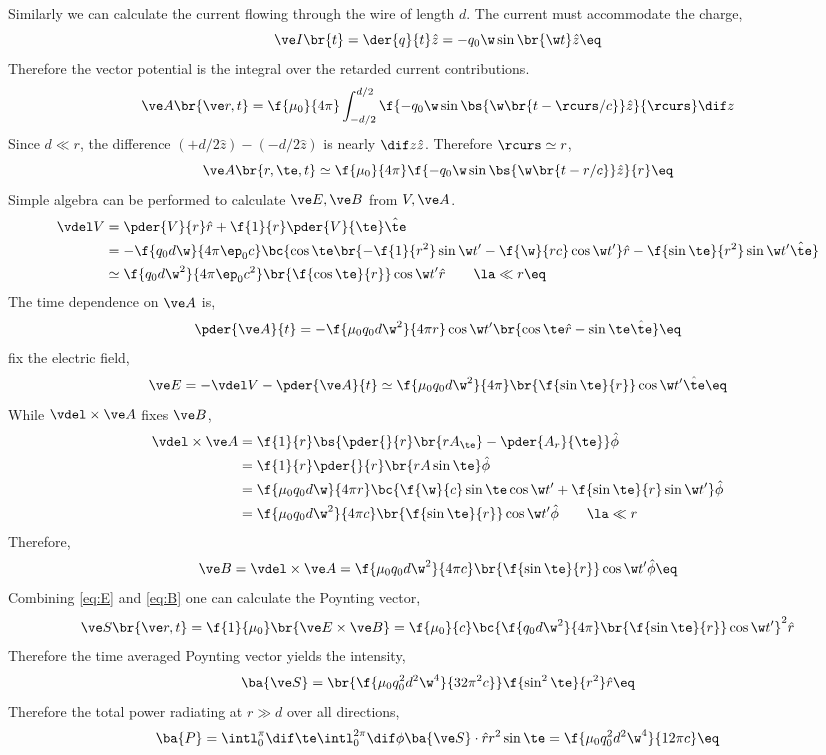 \documentclass{article}
\begin{document}
Similarly we can calculate the current flowing through the wire of length $d$. The current must accommodate the charge,
\[ \ve I \br{t} = \der{q}{t}\hat z = - q_0 \w \sin \br{\w t} \hat z \eq \label{eq:current} \]
Therefore the vector potential is the integral over the retarded current contributions.
\[ \ve A \br{\ve r, t} = \f{\mu_0}{4 \pi} \int_{-d/2}^{d/2} \f{- q_0 \w \sin\bs{\w\br{t - \rcurs / c}} \hat z}{\rcurs} \dif z \]
Since $d \ll r$, the difference $(+ d/2 \hat z) - (- d/2 \hat z)$ is nearly $\dif z \hat z$. Therefore $\rcurs \simeq r$,
\[ \ve A \br{r, \te, t} \simeq \f{\mu_0}{4 \pi} \f{- q_0 \w \sin\bs{\w\br{t - r / c}} \hat z}{r} \eq\label{eq:A}\]
Simple algebra can be performed to calculate $\ve E, \ve B$ from $V, \ve A$.
\begin{align*}
\vdel V
&= \pder{V}{r} \hat r + \f{1}{r} \pder{V}{\te} \hat \te \\
&= -\f{q_0 d \w}{4 \pi \ep_0 c} \bc{\cos \te \br{- \f{1}{r^2} \sin \w t' - \f{\w}{rc} \cos \w t'} \hat r - \f{\sin \te}{r^2}\sin\w t' \hat \te }\\
&\simeq \f{q_0 d \w^2}{4 \pi \ep_0 c^2} \br{\f{\cos \te}{r}} \cos \w t' \hat r \qquad \la \ll r \eq \label{eq:gradV}
\end{align*}
The time dependence on $\ve A$ is,
\[ \pder{\ve A}{t} = - \f{\mu_0 q_0 d \w^2}{4 \pi r} \cos \w t' \br{\cos \te \hat r - \sin \te \hat \te} \eq\label{eq:tA}\]
 fix the electric field,
\[ \ve E = - \vdel V - \pder{\ve A}{t} \simeq \f{\mu_0 q_0 d \w^2}{4 \pi} \br{\f{\sin \te}{r}}\cos \w t'\hat \te \eq \label{eq:E}\]
While $\vdel \times \ve A$ fixes $\ve B$,
\begin{align*}
\vdel \times \ve A
&= \f{1}{r} \bs{\pder{}{r} \br{r A_\te} - \pder{A_r}{\te}}\hat\phi \\
&= \f{1}{r} \pder{}{r} \br{r A \sin \te}\hat\phi \\
&= \f{\mu_0 q_0 d \w}{4 \pi r} \bc{\f{\w}{c} \sin \te \cos \w t' + \f{\sin \te}{r} \sin \w t'}\hat \phi \\
&= \f{\mu_0 q_0 d \w^2}{4 \pi c} \br{\f{\sin \te}{r}} \cos \w t'\hat \phi \qquad \la \ll r
\end{align*}
Therefore,
\[ \ve B = \vdel \times \ve A = \f{\mu_0 q_0 d \w^2}{4 \pi c} \br{\f{\sin \te}{r}} \cos \w t'\hat \phi \eq \label{eq:B} \]
Combining \cref{eq:E} and \cref{eq:B} one can calculate the Poynting vector,
\[ \ve S \br{\ve r, t} = \f{1}{\mu_0} \br{\ve E \times \ve B} = \f{\mu_0}{c} \bc{\f{q_0 d \w^2}{4 \pi}\br{\f{\sin \te}{r}} \cos \w t'}^2 \hat r \]
Therefore the time averaged Poynting vector yields the intensity,
\[ \ba{\ve S} = \br{\f{\mu_0 q_0^2 d^2 \w^4}{32 \pi^2 c}}\f{\sin^2 \te}{r^2} \hat r \eq \label{eq:as_before}\]
Therefore the total power radiating at $r \gg d$ over all directions,
\[ \ba{P} = \intl_{0}^{\pi} \dif \te \intl_{0}^{2 \pi} \dif \phi \ba{\ve S} \cdot \hat r r^2 \sin \te = \f{\mu_0 q_0^2 d^2 \w^4}{12 \pi c} \eq \label{eq:dipole_radiation_power}\]
\end{document}
